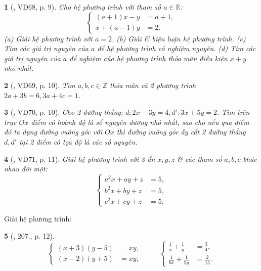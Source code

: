 \documentclass{article}
\newtheorem{baitoan}{}
\begin{document}
\begin{baitoan}[\cite{Binh_Toan_9_tap_2}, VD68, p. 9]
	Cho hệ phương trình với tham số $a\in\mathbb{R}$:
	\begin{equation*}
		\left\{\begin{split}
			(a + 1)x - y &= a + 1,\\
			x + (a - 1)y &= 2.
		\end{split}\right.
	\end{equation*}
	(a) Giải hệ phương trình với $a = 2$. (b) Giải \& biện luận hệ phương trình. (c) Tìm các giá trị nguyên của $a$ để hệ phương trình có nghiệm nguyên. (d) Tìm các giá trị nguyên của $a$ để nghiệm của hệ phương trình thỏa mãn điều kiện $x + y$ nhỏ nhất.
\end{baitoan}

\begin{baitoan}[\cite{Binh_Toan_9_tap_2}, VD69, p. 10]
	Tìm $a,b,c\in\mathbb{Z}$ thỏa mãn cả 2 phương trình $2a + 3b = 6,3a + 4c = 1$.
\end{baitoan}

\begin{baitoan}[\cite{Binh_Toan_9_tap_2}, VD70, p. 10]
	Cho 2 đường thẳng: $d:2x - 3y = 4,d':3x + 5y = 2$. Tìm trên trục $Ox$ điểm có hoành độ là số nguyên dương nhỏ nhất, sao cho nếu qua điểm đó ta dựng đường vuông góc với $Ox$ thì đường vuông góc ấy cắt 2 đường thẳng $d,d'$ tại 2 điểm có tọa độ là các số nguyên.
\end{baitoan}

\begin{baitoan}[\cite{Binh_Toan_9_tap_2}, VD71, p. 11]
	Giải hệ phương trình với 3 ẩn $x,y,z$ \& các tham số $a,b,c$ khác nhau đôi một:
	\begin{equation*}
		\left\{\begin{split}
			a^2x + ay + z &= 5,\\
			b^2x + by + z &= 5,\\
			c^2x + cy + z &= 5.
		\end{split}\right.
	\end{equation*}
\end{baitoan}
Giải hệ phương trình:

\begin{baitoan}[\cite{Binh_Toan_9_tap_2}, 207., p. 12]
	\begin{equation*}
		\left\{\begin{split}
			(x + 3)(y - 5) &= xy,\\
			(x - 2)(y + 5) &= xy,
		\end{split}\right.\hspace{1cm} \left\{\begin{split}
			\frac{1}{x}	+ \frac{1}{y} &= \frac{3}{4},\\
			\frac{1}{6x} + \frac{1}{5y} &= \frac{2}{15}.
		\end{split}\right. 
	\end{equation*}
\end{baitoan}
\end{document}

